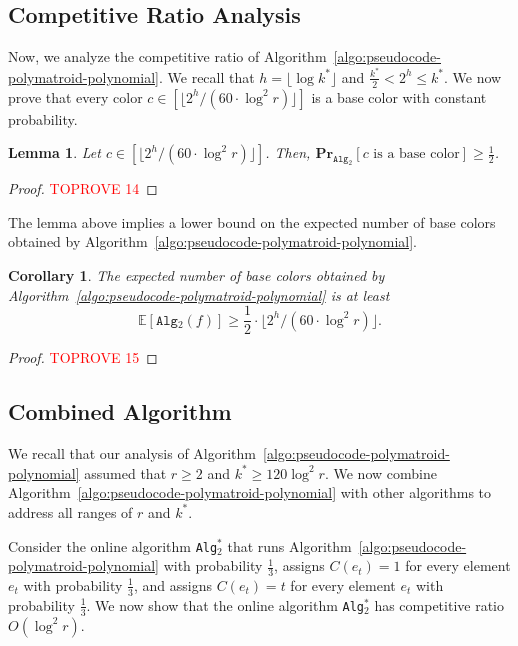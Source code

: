 \documentclass[11pt]{article}
\newtheorem{lemma}{Lemma}
\newtheorem{corollary}{Corollary}
\theoremstyle{definition}
\begin{document}
\subsection{Competitive Ratio Analysis}
Now, we analyze the competitive ratio of Algorithm~\ref{algo:pseudocode-polymatroid-polynomial}. We recall that $h=\lfloor \log k^* \rfloor$ and $\frac{k^*}{2}< 2^h \leq k^*$. We now prove that every color $c\in [\lfloor 2^h/(60\cdot \log ^2 r)\rfloor]$ is a base color with constant probability.

\begin{lemma}\label{lemma:proper-color-probability-poly}
    Let $c \in [\lfloor 2^h/ (60\cdot \log^2 r)\rfloor]$. Then, $\mathbf{Pr}_{\texttt{Alg$_2$} }[c \text{ is a base color}]\geq \frac{1}{2}$.
\end{lemma}
\begin{proof}\textcolor{red}{TOPROVE 14}\end{proof}

The lemma above implies a lower bound on the expected number of base colors obtained by Algorithm~\ref{algo:pseudocode-polymatroid-polynomial}.

\begin{corollary}\label{corollary:number-proper-colors-poly}
    The expected number of base colors obtained by Algorithm~\ref{algo:pseudocode-polymatroid-polynomial} is at least $$\mathbb{E}[\texttt{Alg$_2$}(f)]\geq \frac{1}{2}\cdot \lfloor 2^h/ (60\cdot \log^2 r)\rfloor.$$
\end{corollary}
\begin{proof}\textcolor{red}{TOPROVE 15}\end{proof}

\subsection{Combined Algorithm}
We recall that our analysis of Algorithm~\ref{algo:pseudocode-polymatroid-polynomial} assumed that $r\geq 2$ and $k^*\geq 120\log^2 r$. We now combine Algorithm~\ref{algo:pseudocode-polymatroid-polynomial} with other algorithms to address all ranges of $r$ and $k^*$.

Consider the online algorithm \texttt{Alg$_2^*$} that runs Algorithm~\ref{algo:pseudocode-polymatroid-polynomial} with probability $\frac{1}{3}$, assigns $C(e_t)=1$ for every element $e_t$ with probability $\frac{1}{3}$, and assigns $C(e_t)=t$ for every element $e_t$ with probability $\frac{1}{3}$. We now show that the online algorithm \texttt{Alg$_2^*$} has competitive ratio $O(\log^2 r)$.
\end{document}
